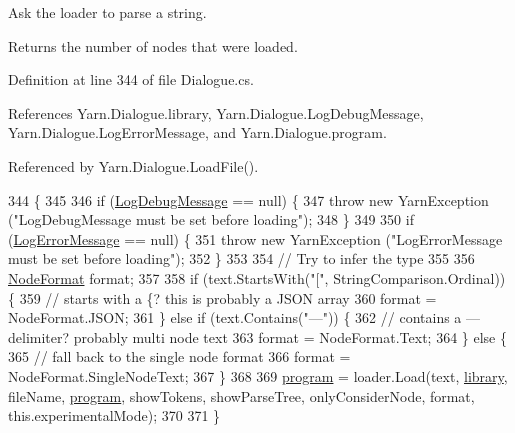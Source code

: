 Ask the loader to parse a string. 

Returns the number of nodes that were loaded. 

Definition at line 344 of file Dialogue.\-cs.



References Yarn.\-Dialogue.\-library, Yarn.\-Dialogue.\-Log\-Debug\-Message, Yarn.\-Dialogue.\-Log\-Error\-Message, and Yarn.\-Dialogue.\-program.



Referenced by Yarn.\-Dialogue.\-Load\-File().


\begin{DoxyCode}
344                                                                                                            
                                                 \{
345 
346             \textcolor{keywordflow}{if} (\hyperlink{a00086_a381f48bb0fbb294f8cf44ca57f11be31}{LogDebugMessage} == null) \{
347                 \textcolor{keywordflow}{throw} \textcolor{keyword}{new} YarnException (\textcolor{stringliteral}{"LogDebugMessage must be set before loading"});
348             \}
349 
350             \textcolor{keywordflow}{if} (\hyperlink{a00086_a9801e83dd044d6498fdf6ebcc6bec5ac}{LogErrorMessage} == null) \{
351                 \textcolor{keywordflow}{throw} \textcolor{keyword}{new} YarnException (\textcolor{stringliteral}{"LogErrorMessage must be set before loading"});
352             \}
353 
354             \textcolor{comment}{// Try to infer the type}
355 
356             \hyperlink{a00045_ad7ebb46e7309ead8767383a672b3272f}{NodeFormat} format;
357 
358             \textcolor{keywordflow}{if} (text.StartsWith(\textcolor{stringliteral}{"["}, StringComparison.Ordinal)) \{
359                 \textcolor{comment}{// starts with a \{? this is probably a JSON array}
360                 format = NodeFormat.JSON;
361             \} \textcolor{keywordflow}{else} \textcolor{keywordflow}{if} (text.Contains(\textcolor{stringliteral}{"---"})) \{
362                 \textcolor{comment}{// contains a --- delimiter? probably multi node text}
363                 format = NodeFormat.Text;
364             \} \textcolor{keywordflow}{else} \{
365                 \textcolor{comment}{// fall back to the single node format}
366                 format = NodeFormat.SingleNodeText;
367             \}
368 
369             \hyperlink{a00086_a0a1cca92325f430425d784d416cb5c2b}{program} = loader.Load(text, \hyperlink{a00086_ae660d4cfb6e296358d2f61d8ee74c66a}{library}, fileName, \hyperlink{a00086_a0a1cca92325f430425d784d416cb5c2b}{program}, showTokens, 
      showParseTree, onlyConsiderNode, format, this.experimentalMode);
370 
371         \}
\end{DoxyCode}



